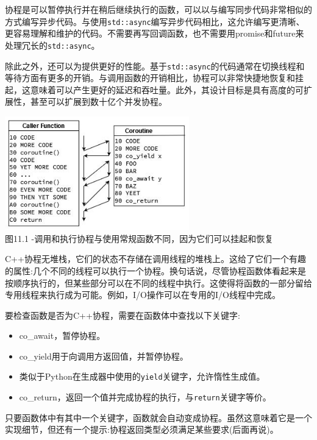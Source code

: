 
协程是可以暂停执行并在稍后继续执行的函数，可以以与编写同步代码非常相似的方式编写异步代码。与使用\texttt{std::async}编写异步代码相比，这允许编写更清晰、更容易理解和维护的代码。不需要再写回调函数，也不需要用promise和future来处理冗长的\texttt{std::async}。

除此之外，还可以为提供更好的性能。基于\texttt{std::async}的代码通常在切换线程和等待方面有更多的开销。与调用函数的开销相比，协程可以非常快捷地恢复和挂起，这意味着可以产生更好的延迟和吞吐量。此外，其设计目标是具有高度的可扩展性，甚至可以扩展到数十亿个并发协程。

\begin{center}
\includegraphics[width=0.6\textwidth]{content/3/chapter11/images/1.jpg}\\
图11.1 -调用和执行协程与使用常规函数不同，因为它们可以挂起和恢复
\end{center}

C++协程无堆栈，它们的状态不存储在调用线程的堆栈上。这给了它们一个有趣的属性:几个不同的线程可以执行一个协程。换句话说，尽管协程函数体看起来是按顺序执行的，但某些部分可以在不同的线程中执行。这使得将函数的一部分留给专用线程来执行成为可能。例如，I/O操作可以在专用的I/O线程中完成。

要检查函数是否为C++协程，需要在函数体中查找以下关键字:

\begin{itemize}
\item 
co\_await，暂停协程。

\item 
co\_yield用于向调用方返回值，并暂停协程。

\item 
类似于Python在生成器中使用的\texttt{yield}关键字，允许惰性生成值。

\item 
co\_return，返回一个值并完成协程的执行，与\texttt{return}关键字等价。
\end{itemize}

只要函数体中有其中一个关键字，函数就会自动变成协程。虽然这意味着它是一个实现细节，但还有一个提示:协程返回类型必须满足某些要求(后面再说)。

